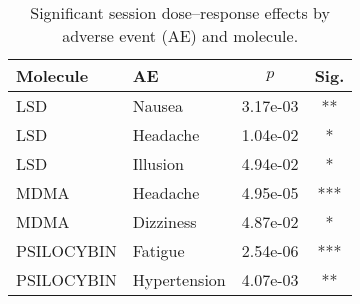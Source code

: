 \begin{table}[htbp]
  \centering
  \caption{Significant session dose--response effects by adverse event (AE) and molecule.}
  \label{tab:dr-ae-by-molecule-session}
  \begin{tabular}{llcc}
    \toprule
    Molecule & AE & $p$ & Sig. \\
    \midrule
    LSD & Nausea & 3.17e-03 & ** \\
    LSD & Headache & 1.04e-02 & * \\
    LSD & Illusion & 4.94e-02 & * \\
    MDMA & Headache & 4.95e-05 & *** \\
    MDMA & Dizziness & 4.87e-02 & * \\
    PSILOCYBIN & Fatigue & 2.54e-06 & *** \\
    PSILOCYBIN & Hypertension & 4.07e-03 & ** \\
    \bottomrule
  \end{tabular}
\end{table}
